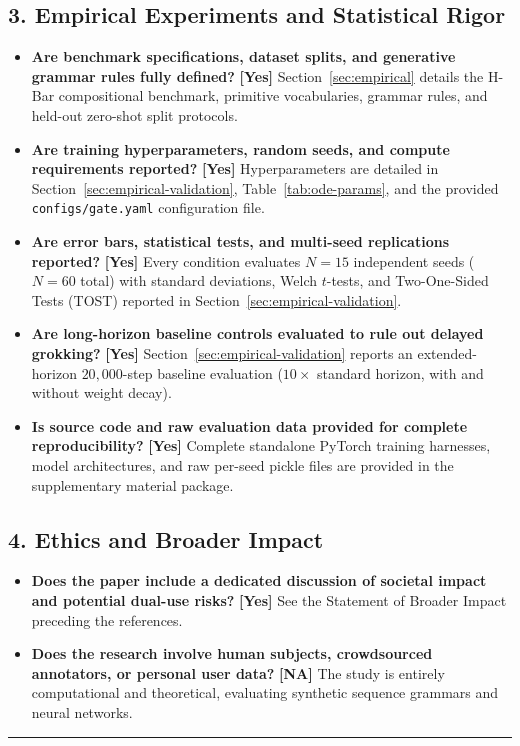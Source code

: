 \documentclass{article}
\theoremstyle{definition}
\begin{document}
\subsection*{3. Empirical Experiments and Statistical Rigor}
\begin{itemize}[nosep]
\item \textbf{Are benchmark specifications, dataset splits, and generative grammar rules fully defined?} \textbf{[Yes]} Section~\ref{sec:empirical} details the H-Bar compositional benchmark, primitive vocabularies, grammar rules, and held-out zero-shot split protocols.
\item \textbf{Are training hyperparameters, random seeds, and compute requirements reported?} \textbf{[Yes]} Hyperparameters are detailed in Section~\ref{sec:empirical-validation}, Table~\ref{tab:ode-params}, and the provided \texttt{configs/gate.yaml} configuration file.
\item \textbf{Are error bars, statistical tests, and multi-seed replications reported?} \textbf{[Yes]} Every condition evaluates $N=15$ independent seeds ($N=60$ total) with standard deviations, Welch $t$-tests, and Two-One-Sided Tests (TOST) reported in Section~\ref{sec:empirical-validation}.
\item \textbf{Are long-horizon baseline controls evaluated to rule out delayed grokking?} \textbf{[Yes]} Section~\ref{sec:empirical-validation} reports an extended-horizon $20{,}000$-step baseline evaluation ($10\times$ standard horizon, with and without weight decay).
\item \textbf{Is source code and raw evaluation data provided for complete reproducibility?} \textbf{[Yes]} Complete standalone PyTorch training harnesses, model architectures, and raw per-seed pickle files are provided in the supplementary material package.
\end{itemize}

\subsection*{4. Ethics and Broader Impact}
\begin{itemize}[nosep]
\item \textbf{Does the paper include a dedicated discussion of societal impact and potential dual-use risks?} \textbf{[Yes]} See the Statement of Broader Impact preceding the references.
\item \textbf{Does the research involve human subjects, crowdsourced annotators, or personal user data?} \textbf{[NA]} The study is entirely computational and theoretical, evaluating synthetic sequence grammars and neural networks.
\end{itemize}

\noindent\rule{\linewidth}{0.4pt}
\end{document}
